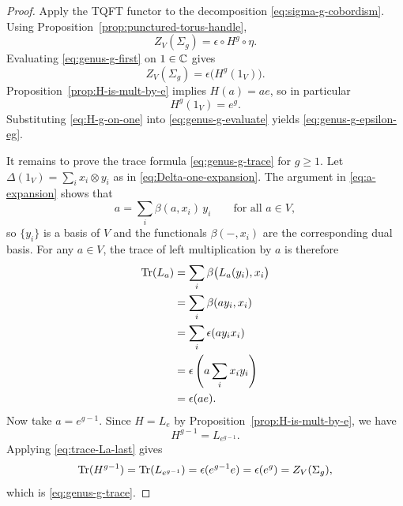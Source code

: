 \begin{proof}
Apply the TQFT functor to the decomposition \eqref{eq:sigma-g-cobordism}. Using Proposition~\ref{prop:punctured-torus-handle},
\begin{equation}\label{eq:genus-g-first}
Z_V(\Sigma_g)=\epsilon \circ H^g \circ \eta.
\end{equation}
Evaluating \eqref{eq:genus-g-first} on $1 \in \mathbb{C}$ gives
\begin{equation}\label{eq:genus-g-evaluate}
Z_V(\Sigma_g)=\epsilon\bigl(H^g(1_V)\bigr).
\end{equation}
Proposition~\ref{prop:H-is-mult-by-e} implies $H(a)=ae$, so in particular
\begin{equation}\label{eq:H-g-on-one}
H^g(1_V)=e^g.
\end{equation}
Substituting \eqref{eq:H-g-on-one} into \eqref{eq:genus-g-evaluate} yields \eqref{eq:genus-g-epsilon-eg}.

\medskip

\noindent It remains to prove the trace formula \eqref{eq:genus-g-trace} for $g \geq 1$. Let $\Delta(1_V)=\sum_i x_i \otimes y_i$ as in \eqref{eq:Delta-one-expansion}. The argument in \eqref{eq:a-expansion} shows that
\begin{equation}\label{eq:dual-basis-trace}
a=\sum_i \beta(a,x_i)\, y_i
\qquad
\text{for all } a \in V,
\end{equation}
so $\{y_i\}$ is a basis of $V$ and the functionals $\beta(-,x_i)$ are the corresponding dual basis. For any $a \in V$, the trace of left multiplication by $a$ is therefore
\begin{align}
\operatorname{Tr}(L_a)
&= \sum_i \beta\bigl(L_a(y_i),x_i\bigr) \label{eq:trace-La-first} \\
&= \sum_i \beta(ay_i,x_i) \nonumber \\
&= \sum_i \epsilon(ay_i x_i) \nonumber \\
&= \epsilon\left(a \sum_i x_i y_i\right) \nonumber \\
&= \epsilon(ae). \label{eq:trace-La-last}
\end{align}
Now take $a=e^{g-1}$. Since $H=L_e$ by Proposition~\ref{prop:H-is-mult-by-e}, we have
\begin{equation}\label{eq:H-trace-power}
H^{g-1}=L_{e^{g-1}}.
\end{equation}
Applying \eqref{eq:trace-La-last} gives
\begin{equation}\label{eq:trace-handle-final}
\operatorname{Tr}(H^{g-1})=\operatorname{Tr}(L_{e^{g-1}})=\epsilon(e^{g-1}e)=\epsilon(e^g)=Z_V(\Sigma_g),
\end{equation}
which is \eqref{eq:genus-g-trace}.
\end{proof}

